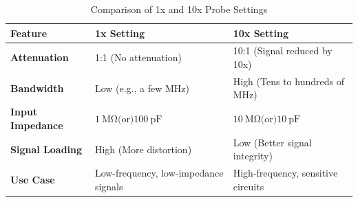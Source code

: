 \documentclass[12pt]{article}
\begin{document}
\begin{table}[H]
\centering
\renewcommand{\arraystretch}{1.5}
\setlength{\tabcolsep}{10pt}
\caption{Comparison of 1x and 10x Probe Settings}
\begin{tabular}{@{}|p{4cm}|p{5cm}|p{5cm}|@{}}
\hline
\textbf{Feature}          & \textbf{1x Setting}                             & \textbf{10x Setting}                            \\ \hline
\textbf{Attenuation}      & 1:1 (No attenuation)                           & 10:1 (Signal reduced by 10x)                   \\ \hline
\textbf{Bandwidth}        & Low (e.g., a few MHz)                          & High (Tens to hundreds of MHz)                 \\ \hline
\textbf{Input Impedance}  & \(1~\mathrm{M\Omega} \text{(or)} 100~\mathrm{pF}\) & \(10~\mathrm{M\Omega} \text{(or)} 10~\mathrm{pF}\) \\ \hline
\textbf{Signal Loading}   & High (More distortion)                         & Low (Better signal integrity)                  \\ \hline
\textbf{Use Case}         & Low-frequency, low-impedance signals           & High-frequency, sensitive circuits             \\ \hline
\end{tabular}
\end{table}
\end{document}
